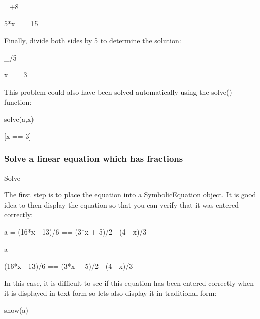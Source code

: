 \documentclass[12pt,oneside]{book}
\begin{document}
\_+8

{\textbar}

5*x == 15

{\textquotedbl}{\textquotedbl}{\textquotedbl}

Finally, divide both sides by 5 to determine the solution:

{\textquotedbl}{\textquotedbl}{\textquotedbl}

\_/5

{\textbar}

x == 3

{\textquotedbl}{\textquotedbl}{\textquotedbl}

This problem could also have been solved automatically using the solve() function:

{\textquotedbl}{\textquotedbl}{\textquotedbl}

solve(a,x)

{\textbar}

[x == 3]

\subsubsection[Solve a linear equation which has fractions]{Solve a linear equation which has fractions}

Solve 


{\textquotedbl}{\textquotedbl}{\textquotedbl}

The first step is to place the equation into a SymbolicEquation object. It is good idea to then display the equation so that you can verify that it was entered correctly:

{\textquotedbl}{\textquotedbl}{\textquotedbl}

a = (16*x {}- 13)/6 == (3*x + 5)/2 {}- (4 {}- x)/3

a

{\textbar}

(16*x {}- 13)/6 == (3*x + 5)/2 {}- (4 {}- x)/3


{\textquotedbl}{\textquotedbl}{\textquotedbl}

In this case, it is difficult to see if this equation has been entered correctly when it is displayed in text form so lets also display it in traditional form:

{\textquotedbl}{\textquotedbl}{\textquotedbl}

show(a)

{\textbar}

{\textquotedbl}{\textquotedbl}{\textquotedbl}
\end{document}
